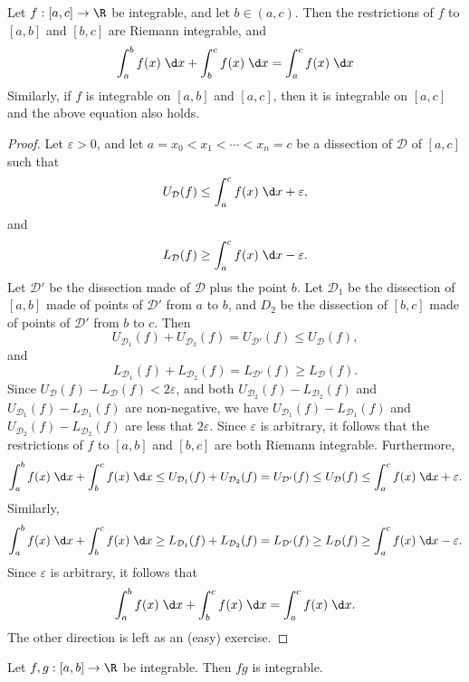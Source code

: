 \documentclass[a4paper]{article}
\begin{document}
\begin{prop}
  Let $f: [a, c] \to \R$ be integrable, and let $b\in (a, c)$. Then the restrictions of $f$ to $[a, b]$ and $[b, c]$ are Riemann integrable, and
  \[
    \int_a^b f(x)\;\d x + \int_b^c f(x)\;\d x = \int_a^c f(x) \;\d x
  \]
  Similarly, if $f$ is integrable on $[a, b]$ and $[a, c]$, then it is integrable on $[a, c]$ and the above equation also holds.
\end{prop}

\begin{proof}
  Let $\varepsilon> 0$, and let $a = x_0 < x_1 < \cdots < x_n = c$ be a dissection of $\mathcal{D}$ of $[a, c]$ such that
  \[
    U_\mathcal{D}(f) \leq \int_a^c f(x)\;\d x + \varepsilon,
  \]
  and
  \[
    L_\mathcal{D}(f) \geq \int_a^c f(x)\;\d x - \varepsilon.
  \]
  Let $\mathcal{D}'$ be the dissection made of $\mathcal{D}$ plus the point $b$. Let $\mathcal{D}_1$ be the dissection of $[a, b]$ made of points of $\mathcal{D}'$ from $a$ to $b$, and $D_2$ be the dissection of $[b, c]$ made of points of $\mathcal{D}'$ from $b$ to $c$. Then
  \[
    U_{\mathcal{D}_1}(f) + U_{\mathcal{D}_2}(f) = U_{\mathcal{D}'}(f) \leq U_{\mathcal{D}}(f),
  \]
  and
  \[
    L_{\mathcal{D}_1}(f) + L_{\mathcal{D}_2}(f) = L_{\mathcal{D}'}(f) \geq L_\mathcal{D} (f).
  \]
  Since $U_\mathcal{D}(f) - L_\mathcal{D}(f) < 2\varepsilon$, and both $U_{\mathcal{D}_2}(f) - L_{\mathcal{D}_2} (f)$ and $U_{\mathcal{D}_1}(f) - L_{\mathcal{D}_1} (f)$ are non-negative, we have $U_{\mathcal{D}_1} (f) - L_{\mathcal{D}_1} (f)$ and $U_{\mathcal{D}_2}(f) - L_{\mathcal{D}_2}(f)$ are less that $2\varepsilon$. Since $\varepsilon$ is arbitrary, it follows that the restrictions of $f$ to $[a, b]$ and $[b, c]$ are both Riemann integrable. Furthermore,
  \[
    \int_a^b f(x)\;\d x + \int_b^c f(x)\;\d x \leq U_{\mathcal{D}_1}(f) + U_{\mathcal{D}_2}(f) = U_{\mathcal{D}'}(f) \leq U_{\mathcal{D}}(f) \leq \int_a^c f(x)\;\d x + \varepsilon.
  \]
  Similarly,
  \[
    \int_a^bf(x)\;\d x + \int_b^cf(x)\;\d x \geq L_{\mathcal{D}_1}(f) + L_{\mathcal{D}_2}(f) = L_{\mathcal{D}'}(f) \geq L_{\mathcal{D}}(f) \geq \int_a^c f(x)\;\d x - \varepsilon.
  \]
  Since $\varepsilon$ is arbitrary, it follows that
  \[
    \int_a^b f(x)\;\d x + \int_b^c f(x)\;\d x = \int_a^c f(x)\;\d x.
  \]
  The other direction is left as an (easy) exercise.
\end{proof}

\begin{prop}
  Let $f, g: [a, b] \to \R$ be integrable. Then $fg$ is integrable.
\end{prop}
\end{document}
